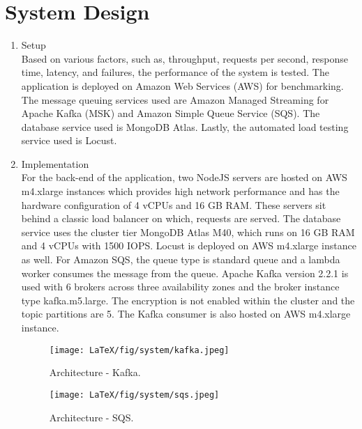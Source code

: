 \documentclass{IEEEtran}
\begin{document}
\section{System Design}\label{sec:system design}
\renewcommand{\labelenumi}{\Alph{enumi})}
\begin{enumerate}
    \item Setup \\ Based on various factors, such as, throughput, requests per second, response time, latency, and failures, the performance of the system is tested.  The application is deployed on Amazon Web Services (AWS) for benchmarking. The message queuing services used are Amazon Managed Streaming for Apache Kafka (MSK) and Amazon Simple Queue Service (SQS). The database service used is MongoDB Atlas. Lastly, the automated load testing service used is Locust. \cite{locust} \\

    \item Implementation \\ For the back-end of the application, two NodeJS servers are hosted on AWS m4.xlarge instances which provides high network performance and has the hardware configuration of 4 vCPUs and 16 GB RAM. \cite{AWSEC2} These servers sit behind a classic load balancer on which, requests are served. The database service uses the cluster tier MongoDB Atlas M40, which runs on 16 GB RAM and 4 vCPUs with 1500 IOPS. \cite{MDBAtlas} Locust is deployed on AWS m4.xlarge instance as well. For Amazon SQS, the queue type is standard queue and a lambda worker consumes the message from the queue. Apache Kafka version 2.2.1 \cite{KafkaVersion} is used with 6 brokers across three availability zones and the broker instance type kafka.m5.large. \cite{MSKFaqs} The encryption is not enabled within the cluster and the topic partitions are 5. The Kafka consumer is also hosted on AWS m4.xlarge instance.

    \begin{figure}[H]
    \texttt{[image: LaTeX/fig/system/kafka.jpeg]}
    \caption{Architecture - Kafka.} 
    \end{figure}
    
    \begin{figure}[H]
    \texttt{[image: LaTeX/fig/system/sqs.jpeg]}
    \caption{Architecture - SQS.}
    \end{figure}
\end{enumerate}
\end{document}
